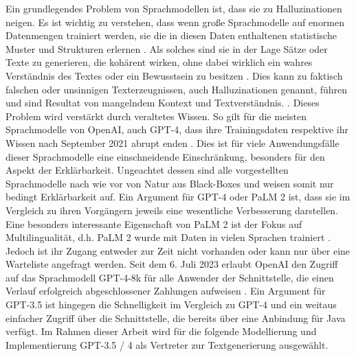 Ein grundlegendes Problem von Sprachmodellen ist, dass sie zu Halluzinationen neigen.
Es ist wichtig zu verstehen, dass wenn große Sprachmodelle auf enormen Datenmengen trainiert werden, sie die in diesen Daten enthaltenen statistische Muster und Strukturen erlernen \cite{basel-ml-arch}.
Als solches sind sie in der Lage Sätze oder Texte zu generieren, die kohärent wirken, ohne dabei wirklich ein wahres Verständnis des Textes oder ein Bewusstsein zu besitzen \cite{basel-ml-arch}.
Dies kann zu faktisch falschen oder unsinnigen Texterzeugnissen, auch Halluzinationen genannt, führen und sind Resultat von mangelndem Kontext und Textverständnis. \cite{sabre-pc-ai-hallucinations}.
Dieses Problem wird verstärkt durch veraltetes Wissen.
So gilt für die meisten Sprachmodelle von OpenAI, auch GPT-4, dass ihre Trainingsdaten respektive ihr Wissen nach September 2021 abrupt enden \cite{openai-gpt-sep-2021}.
Dies ist für viele Anwendungsfälle dieser Sprachmodelle eine einschneidende Einschränkung, besonders für den Aspekt der Erklärbarkeit.
Ungeachtet dessen sind alle vorgestellten Sprachmodelle nach wie vor von Natur aus Black-Boxes und weisen somit nur bedingt Erklärbarkeit auf.
Ein Argument für GPT-4 oder PaLM 2 ist, dass sie im Vergleich zu ihren Vorgängern jeweils eine wesentliche Verbesserung darstellen.
Eine besonders interessante Eigenschaft von PaLM 2 ist der Fokus auf Multilingualität, d.h. PaLM 2 wurde mit Daten in vielen Sprachen trainiert \cite{google-palm2-techreport}.
Jedoch ist ihr Zugang entweder zur Zeit nicht vorhanden oder kann nur über eine Warteliste angefragt werden.
Seit dem 6. Juli 2023 erlaubt OpenAI den Zugriff auf das Sprachmodell GPT-4-8k für alle Anwender der Schnittstelle, die einen Verlauf erfolgreich abgeschlossener Zahlungen aufweisen \cite{openai-gpt4-access}.
Ein Argument für GPT-3.5 ist hingegen die Schnelligkeit im Vergleich zu GPT-4 und ein weitaus einfacher Zugriff über die Schnittstelle, die bereits über eine Anbindung für Java verfügt.
Im Rahmen dieser Arbeit wird für die folgende Modellierung und Implementierung GPT-3.5 / 4 als Vertreter zur Textgenerierung ausgewählt.


